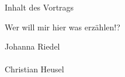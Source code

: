 



\begin{frame}[fragile]
    \maketitle{}
\end{frame}

\begin{frame}{Inhalt des Vortrags}
    \begin{minipage}[t]{0.515\textwidth}
        \tableofcontents[hideallsubsections, sections={1-5}]
    \end{minipage}
    \begin{minipage}[t]{0.475\textwidth}
        \tableofcontents[hideallsubsections, sections={6-11}]
    \end{minipage}
\end{frame}

\begin{frame}{Wer will mir hier was erzählen!?}
    \vfill
    \begin{center}
        {\Large Johanna Riedel} \\
         \\
        \vspace{1em}
        {\Large Christian Heusel } \\
         \\
    \end{center}
\end{frame}

